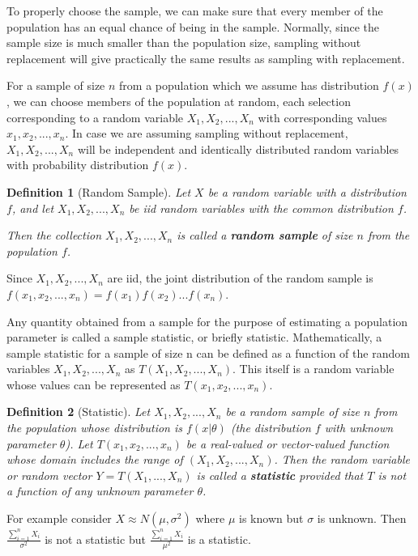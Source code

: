 \documentclass[12pt,twoside]{report}
\newtheorem{defn}{Definition}
\begin{document}
To properly choose the sample, we can make sure that every member of the population has an equal chance of being in the sample.
Normally, since the sample size is much smaller than the population size, sampling without replacement will give practically the same results as sampling with replacement.

For a sample of size $n$ from a population which we assume has distribution $f(x)$, we can choose members of the population at random, each selection corresponding to a random variable $X_1, X_2, ..., X_n$ with corresponding values $x_1, x_2, ..., x_n$. In case we are assuming sampling without replacement, $X_1, X_2, ..., X_n$ will be independent and identically distributed random variables with probability distribution $f(x)$.

\begin{defn}[Random Sample]
Let $X$ be a random variable with a distribution $f$, and let $X_1, X_2, ..., X_n$ be iid random variables with the common distribution $f$.

Then the collection $X_1, X_2, ..., X_n$ is called a \textbf{random sample} of size $n$ from the population $f$.
\end{defn}

Since $X_1, X_2, ..., X_n$ are iid, the joint distribution of the random sample is $f(x_1, x_2, ..., x_n) = f(x_1) f(x_2) ... f(x_n)$.

Any quantity obtained from a sample for the purpose of estimating a population parameter is called a sample
statistic, or briefly statistic. Mathematically, a sample statistic for a sample of size n can be defined as a function of the random variables $X_1, X_2, ..., X_n$ as $T(X_1, X_2, ..., X_n)$. This itself is a random variable whose values can be represented as $T(x_1, x_2, ..., x_n)$.

\begin{defn}[Statistic]
    Let $X_1, X_2, ..., X_n$ be a random sample of size $n$ from the population whose distribution is $f\left (x|\theta\right )$ (the distribution $f$ with unknown parameter $\theta$). Let $T\left (x_1, x_2, ...,x_n\right )$ be a real-valued or vector-valued function whose domain includes the range of $\left (X_1, X_2, ..., X_n\right )$. Then the random variable or random vector $Y = T\left (X_1, ..., X_n\right )$ is called a \textbf{statistic} provided that $T$ is not a function of any unknown parameter $\theta$.
\end{defn}

For example consider $X \approx N(\mu, \sigma^2)$ where $\mu$ is known but $\sigma$ is unknown. Then $\frac{\sum_{i=1}^n X_i}{\sigma^2}$ is not a statistic but $\frac{\sum_{i=1}^n X_i}{\mu^2}$ is a statistic.
\end{document}

